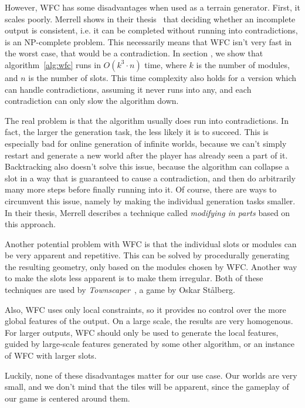 However, WFC has some disadvantages when used as a terrain generator.
First, it scales poorly.
Merrell shows in their thesis~\cite{ModelSynthesis} that deciding whether an incomplete output is consistent, i.e. it can be completed without running into contradictions, is an NP-complete problem.
This necessarily means that WFC isn't very fast in the worst case, that would be a contradiction.
In section , we show that algorithm~\ref{alg:wfc} runs in $O(k^3 \cdot n)$ time, where $k$ is the number of modules, and $n$ is the number of slots.
This time complexity also holds for a version which can handle contradictions, assuming it never runs into any, and each contradiction can only slow the algorithm down.

The real problem is that the algorithm usually does run into contradictions.
In fact, the larger the generation task, the less likely it is to succeed.
This is especially bad for online generation of infinite worlds, because we can't simply restart and generate a new world after the player has already seen a part of it.
Backtracking also doesn't solve this issue, because the algorithm can collapse a slot in a way that is guaranteed to cause a contradiction, and then do arbitrarily many more steps before finally running into it.
Of course, there are ways to circumvent this issue, namely by making the individual generation tasks smaller.
In their thesis, Merrell describes a technique called \emph{modifying in parts} based on this approach.

Another potential problem with WFC is that the individual slots or modules can be very apparent and repetitive.
This can be solved by procedurally generating the resulting geometry, only based on the modules chosen by WFC.
Another way to make the slots less apparent is to make them irregular.
Both of these techniques are used by \emph{Townscaper}~\cite{Townscaper}, a game by Oskar St\r{a}lberg.

Also, WFC uses only local constraints, so it provides no control over the more global features of the output.
On a large scale, the results are very homogenous.
For larger outputs, WFC should only be used to generate the local features, guided by large-scale features generated by some other algorithm, or an instance of WFC with larger slots.

Luckily, none of these disadvantages matter for our use case.
Our worlds are very small, and we don't mind that the tiles will be apparent, since the gameplay of our game is centered around them.

